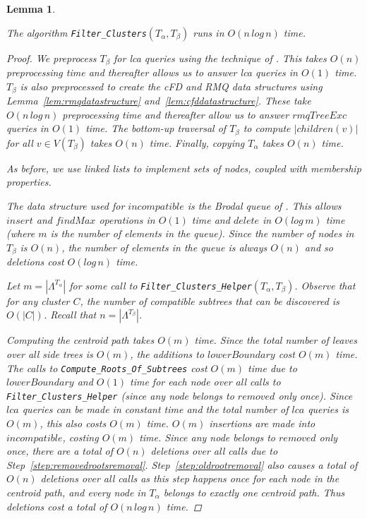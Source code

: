 \documentclass{article}
\newcommand{\leafset}{\Lambda}
\newcommand{\TA}{T_\alpha}
\newcommand{\TB}{T_\beta}
\newtheorem{filterclustersruntime}[incompatibility]{Lemma}
\begin{document}
    \bigskip
    \begin{filterclustersruntime}
        \label{lem:filterclustersruntime}

        The algorithm \texttt{Filter\_Clusters}$(\TA, \TB)$ runs in $O(n\,log\,n)$ time.

        \begin{proof}
            We preprocess $\TB$ for \textit{lca} queries using the technique of \cite{bender2000lca}. This takes $O(n)$ preprocessing time and thereafter allows us to answer \textit{lca} queries in $O(1)$ time. $\TB$ is also preprocessed to create the cFD and RMQ data structures using Lemma~\ref{lem:rmqdatastructure} and~\ref{lem:cfddatastructure}. These take $O(n\,log\,n)$ preprocessing time and thereafter allow us to answer $rmqTreeExc$ queries in $O(1)$ time. The bottom-up traversal of $\TB$ to compute $|children(v)|$ for all $v \in V(\TB)$ takes $O(n)$ time. Finally, copying $\TA$ takes $O(n)$ time.

            As before, we use linked lists to implement sets of nodes, coupled with membership properties.

            The data structure used for $incompatible$ is the Brodal queue of \cite{brodal1995fast}. This allows $insert$ and $findMax$ operations in $O(1)$ time and $delete$ in $O(log\,m)$ time (where $m$ is the number of elements in the queue). Since the number of nodes in $\TB$ is $O(n)$, the number of elements in the queue is always $O(n)$ and so deletions cost $O(log\,n)$ time.

            Let $m = |\leafset^{\TA}|$ for some call to \texttt{Filter\_Clusters\_Helper}$(\TA, \TB)$. Observe that for any cluster $C$, the number of compatible subtrees that can be discovered is $O(|C|)$. Recall that $n = |\leafset^{\TB}|$.

            Computing the centroid path takes $O(m)$ time. Since the total number of leaves over all side trees is $O(m)$, the additions to $lowerBoundary$ cost $O(m)$ time. The calls to \texttt{Compute\_Roots\_Of\_Subtrees} cost $O(m)$ time due to $lowerBoundary$ and $O(1)$ time for each node over all calls to \texttt{Filter\_Clusters\_Helper} (since any node belongs to $removed$ only once). Since $lca$ queries can be made in constant time and the total number of $lca$ queries is $O(m)$, this also costs $O(m)$ time. $O(m)$ insertions are made into $incompatible$, costing $O(m)$ time. Since any node belongs to $removed$ only once, there are a total of $O(n)$ deletions over all calls due to Step~\ref{step:removedrootsremoval}. Step~\ref{step:oldrootremoval} also causes a total of $O(n)$ deletions over all calls as this step happens once for each node in the centroid path, and every node in $\TA$ belongs to exactly one centroid path. Thus deletions cost a total of $O(n\,log\,n)$ time.


\end{proof}
\end{filterclustersruntime}
\end{document}
